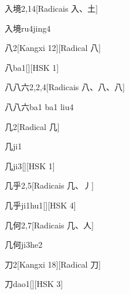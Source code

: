 \begin{entry}{入境}{2,14}[Radicais ⼊、⼟]
  \begin{phonetics}{入境}{ru4jing4}
  \end{phonetics}
\end{entry}

\begin{entry}{八}{2}[Kangxi 12][Radical ⼋]
  \begin{phonetics}{八}{ba1}[][HSK 1]
  \end{phonetics}
\end{entry}

\begin{entry}{八八六}{2,2,4}[Radicais ⼋、⼋、⼋]
  \begin{phonetics}{八八六}{ba1 ba1 liu4}
  \end{phonetics}
\end{entry}

\begin{entry}{几}{2}[Radical ⼏]
  \begin{phonetics}{几}{ji1}
  \end{phonetics}
  \begin{phonetics}{几}{ji3}[][HSK 1]
  \end{phonetics}
\end{entry}

\begin{entry}{几乎}{2,5}[Radicais ⼏、⼃]
  \begin{phonetics}{几乎}{ji1hu1}[][HSK 4]
  \end{phonetics}
\end{entry}

\begin{entry}{几何}{2,7}[Radicais ⼏、⼈]
  \begin{phonetics}{几何}{ji3he2}
  \end{phonetics}
\end{entry}

\begin{entry}{刀}{2}[Kangxi 18][Radical ⼑]
  \begin{phonetics}{刀}{dao1}[][HSK 3]
  \end{phonetics}
\end{entry}

